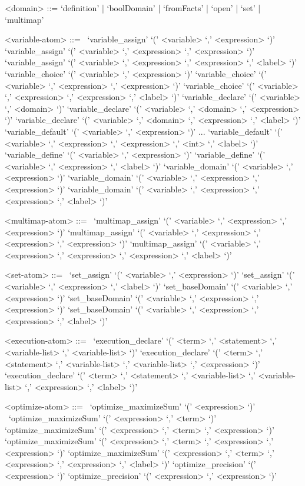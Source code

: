 \begin{grammar}
<domain> ::= `definition' | `boolDomain' | `fromFacts' | `open' | `set' | `multimap'

<variable-atom> ::=
~\alt `variable_assign' `(' <variable> `,' <expression> `)'
\alt `variable_assign' `(' <variable> `,' <expression> `,' <expression> `)'
\alt `variable_assign' `(' <variable> `,' <expression> `,' <expression> `,' <label> `)'
\alt `variable_choice' `(' <variable> `,' <expression> `)'
\alt `variable_choice' `(' <variable> `,' <expression> `,' <expression> `)'
\alt `variable_choice' `(' <variable> `,' <expression> `,' <expression> `,' <label> `)'
\alt `variable_declare' `(' <variable> `,' <domain> `)'
\alt `variable_declare' `(' <variable> `,' <domain> `,' <expression> `)'
\alt `variable_declare' `(' <variable> `,' <domain> `,' <expression> `,' <label> `)'
\alt `variable_default' `(' <variable> `,' <expression> `)'
\alt ...
\alt `variable_default' `(' <variable> `,' <expression> `,' <expression> `,' <int> `,' <label> `)'
\alt `variable_define' `(' <variable> `,' <expression> `)'
\alt `variable_define' `(' <variable> `,' <expression> `,' <label> `)'
\alt `variable_domain' `(' <variable> `,' <expression> `)'
\alt `variable_domain' `(' <variable> `,' <expression> `,' <expression> `)'
\alt `variable_domain' `(' <variable> `,' <expression> `,' <expression> `,' <label> `)'

<multimap-atom> ::=
~\alt `multimap_assign' `(' <variable> `,' <expression> `,' <expression> `)'
\alt `multimap_assign' `(' <variable> `,' <expression> `,' <expression> `,' <expression> `)'
\alt `multimap_assign' `(' <variable> `,' <expression> `,' <expression> `,' <expression> `,' <label> `)'

<set-atom> ::=
~\alt `set_assign' `(' <variable> `,' <expression> `)'
\alt `set_assign' `(' <variable> `,' <expression> `,' <label> `)'
\alt `set_baseDomain' `(' <variable> `,' <expression> `)'
\alt `set_baseDomain' `(' <variable> `,' <expression> `,' <expression> `)'
\alt `set_baseDomain' `(' <variable> `,' <expression> `,' <expression> `,' <label> `)'

<execution-atom> ::=
~\alt `execution_declare' `(' <term> `,' <statement> `,' <variable-list> `,' <variable-list> `)'
\alt `execution_declare' `(' <term> `,' <statement> `,' <variable-list> `,' <variable-list> `,' <expression> `)'
\alt `execution_declare' `(' <term> `,' <statement> `,' <variable-list> `,' <variable-list> `,' <expression> `,' <label> `)'

<optimize-atom> ::=
~\alt `optimize_maximizeSum' `(' <expression> `)'
~\alt `optimize_maximizeSum' `(' <expression> `,' <term> `)'
\alt `optimize_maximizeSum' `(' <expression> `,' <term> `,' <expression> `)'
\alt `optimize_maximizeSum' `(' <expression> `,' <term> `,' <expression> `,' <expression> `)'
\alt `optimize_maximizeSum' `(' <expression> `,' <term> `,' <expression> `,' <expression> `,' <label> `)'
\alt `optimize_precision' `(' <expression>  `)'
\alt `optimize_precision' `(' <expression> `,' <expression> `)'


\end{grammar}
